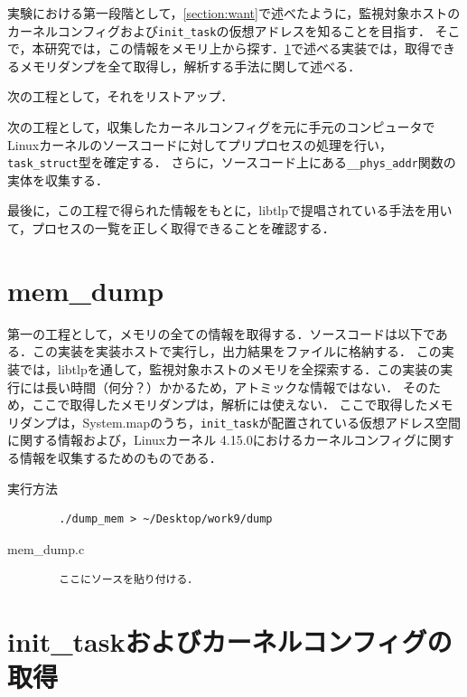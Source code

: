 実験における第一段階として，\ref{section:want}で述べたように，監視対象ホストのカーネルコンフィグおよび\verb|init_task|の仮想アドレスを知ることを目指す．
そこで，本研究では，この情報をメモリ上から探す．\ref{section:mem_dump}で述べる実装では，取得できるメモリダンプを全て取得し，解析する手法に関して述べる．

次の工程として，それをリストアップ．

次の工程として，収集したカーネルコンフィグを元に手元のコンピュータでLinuxカーネルのソースコードに対してプリプロセスの処理を行い，\verb|task_struct|型を確定する．
さらに，ソースコード上にある\verb|__phys_addr|関数の実体を収集する．

最後に，この工程で得られた情報をもとに，libtlpで提唱されている手法を用いて，プロセスの一覧を正しく取得できることを確認する．

\section{mem\_dump}
\label{section:mem_dump}

第一の工程として，メモリの全ての情報を取得する．ソースコードは以下である．この実装を実装ホストで実行し，出力結果をファイルに格納する．
この実装では，libtlpを通して，監視対象ホストのメモリを全探索する．この実装の実行には長い時間（何分？）かかるため，アトミックな情報ではない．
そのため，ここで取得したメモリダンプは，解析には使えない．
ここで取得したメモリダンプは，System.mapのうち，\verb|init_task|が配置されている仮想アドレス空間に関する情報および，Linuxカーネル 4.15.0におけるカーネルコンフィグに関する情報を収集するためのものである．


\begin{itembox}[l]{実行方法}
    \begin{verbatim}
        ./dump_mem > ~/Desktop/work9/dump
    \end{verbatim}
\end{itembox}

\begin{itembox}[l]{mem_dump.c}
    \begin{verbatim}
        ここにソースを貼り付ける．
    \end{verbatim}
\end{itembox}

\section{init\_taskおよびカーネルコンフィグの取得}
\label{section:strings}

